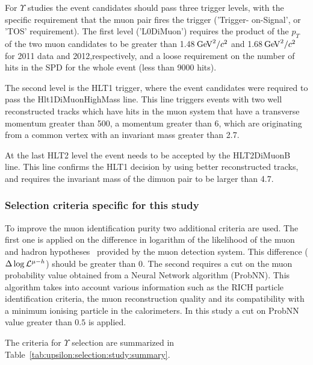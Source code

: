 For $\Upsilon$ studies the event candidates should pass three trigger levels,
with the specific requirement that the muon pair fires the trigger ('Trigger-
on-Signal', or 'TOS' requirement). The first level ('L0DiMuon') requires the
product of the $p_T$ of the two muon candidates to be greater than
1.48$\mathrm{\,Ge\kern -0.1em V}^2/c^2$ and 1.68$\mathrm{\,Ge\kern -0.1em V}^2/c^2$ for 2011 data and 2012,respectively, and
a loose requirement on the number of hits in the SPD for the whole event (less
than 9000 hits).

The second level is the HLT1 trigger, where the event candidates were required to
pass the Hlt1DiMuonHighMass line.
This line triggers events with  two well reconstructed tracks  which have hits
in the muon system  that have a transverse momentum greater than 500\mevc,  
a momentum greater than 6\gevc, which are originating from a common vertex with
an invariant mass greater than 2.7\gevcc.

At the last HLT2 level the event needs to be accepted by the HLT2DiMuonB line.
This line confirms the HLT1 decision by using better reconstructed tracks, 
and requires the invariant mass of the dimuon pair to be larger than 4.7\gevcc.

\subsubsection{Selection criteria specific for this study}
\label{sec:upsilon:selection:study}

To improve the muon identification purity two additional criteria are used. The
first one is applied on the difference in logarithm of the likelihood of the
muon and hadron hypotheses~\cite{Powell} provided by the muon detection system.
This difference ($\Delta\log\mathcal{L}^{\mu-h}$) should be greater than 0. The
second requires a cut on the muon probability value obtained from a Neural
Network algorithm (ProbNN). This algorithm takes into account various
information such as the RICH particle identification criteria, the muon
reconstruction quality and its compatibility with a minimum ionising particle in the
calorimeters. In this study a cut on  ProbNN value
greater than $0.5$ is applied. 

The criteria for  $\Upsilon$ selection are summarized in
Table~\ref{tab:upsilon:selection:study:summary}.




